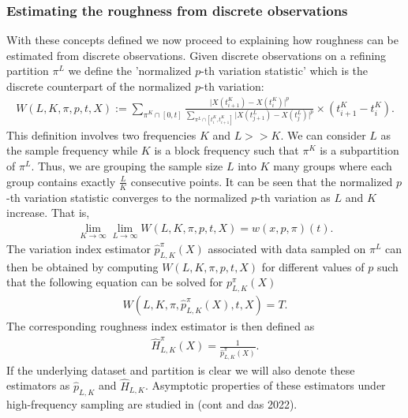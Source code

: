 \documentclass{article}
\begin{document}
\subsubsection{Estimating the roughness from discrete observations}
With these concepts defined we now proceed to explaining how roughness can be estimated from discrete observations. Given discrete observations on a refining partition $\pi^L$ we define the 'normalized $p$-th variation statistic' which is the discrete counterpart of the normalized $p$-th variation:
\begin{align}
W(L, K, \pi, p, t, X) := \sum_{\pi^K\cap [0,t] } \frac{\lvert X(t_{i+1}^K)-X(t_i^K)\rvert^p}{\sum_{\pi^L\cap [t_i^K, t_{i+1}^K]}\lvert X(t_{j+1}^L)-X(t_j^L)\rvert^p} \times (t_{i+1}^K-t_i^K).
\end{align}
This definition involves two frequencies $K$ and $L>>K$. We can consider $L$ as the sample frequency while $K$ is a block frequency such that $\pi^K$ is a subpartition of $\pi^L$. Thus, we are grouping the sample size $L$ into $K$ many groups where each group contains exactly $\frac{L}{K}$ consecutive points. It can be seen that the normalized $p$-th variation statistic converges to the normalized $p$-th variation as $L$ and $K$ increase. That is,
\begin{align}
\lim_{K\rightarrow\infty}\lim_{L\rightarrow\infty} W(L, K, \pi, p, t, X) = w(x, p, \pi)(t).
\end{align}
The variation index estimator $\hat{p}^\pi_{L,K}(X)$ associated with data sampled on $\pi^L$ can then be obtained by computing $W(L, K, \pi, p, t, X)$ for different values of $p$ such that the following equation can be solved for $p^\pi_{L,K}(X)$
\begin{align}
W(L, K, \pi, \hat{p}^\pi_{L,K}(X), t, X) = T. \label{eq:wpth}
\end{align}
The corresponding roughness index estimator is then defined as
\begin{align*}
\hat{H}^\pi_{L,K}(X) = \frac{1}{\hat{p}^\pi_{L,K}(X)}.
\end{align*}
If the underlying dataset and partition is clear we will also denote these estimators as $\hat{p}_{L,K}$ and $\hat{H}_{L,K}$. Asymptotic properties of these estimators under high-frequency sampling are studied in (cont and das 2022). 
\end{document}
